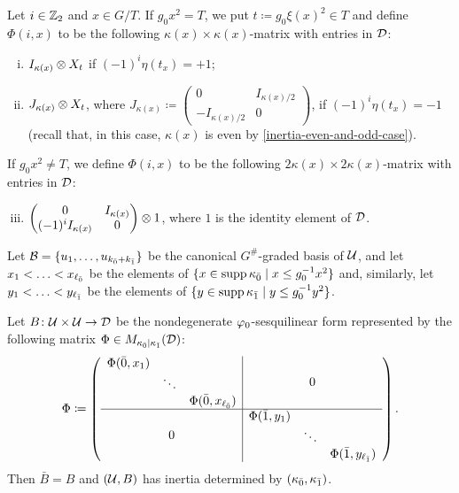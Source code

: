 \begin{defi}\label{defi:blocks-of-Phi}
    Let $i\in \mathbb{Z}_2$ and $x \in G/T$. 
    If $g_0x^2 = T$, we put $t \coloneqq g_0 \xi(x)^2 \in T$ and define $\Phi(i, x)$ to be the following $\kappa(x) \times \kappa(x)$-matrix with entries in $\mathcal{D}$:
    \begin{enumerate}[(i)]
        \item $I_{\kappa(x)} \otimes X_{t}$ if $(-1)^i \eta(t_x) = +1$;
		\item  $J_{\kappa(x)} \otimes X_{t}$, where $J_{\kappa(x)} \coloneqq \begin{pmatrix}
				      0                & I_{\kappa(x)/2} \\
				      -I_{\kappa(x)/2} & 0
			      \end{pmatrix}$, if  $(-1)^i \eta(t_x) = -1$ (recall that, in this case, $\kappa (x)$ is even by \cref{inertia-even-and-odd-case}). 
	\end{enumerate}
    If $g_0 x^2 \neq T$, we define $\Phi(i, x)$ to be the following $2\kappa(x) \times 2\kappa(x)$-matrix with entries in $\mathcal{D}$:
    \begin{enumerate}[(i)]
        \setcounter{enumi}{2}
		\item $\begin{pmatrix}
			0                                                  & I_{\kappa(x)} \\
			(-1)^{i} I_{\kappa(x)} & 0
		\end{pmatrix} \otimes 1$, where $1$ is the identity element of $\mathcal{D}$. 
    \end{enumerate}
\end{defi}

Let $\mathcal B = \{u_1, \ldots, u_{k_{\bar{0}} + k_{\bar{1}}} \}$ be the canonical $G^\#$-graded basis of $\mathcal U$, and 
let $x_1 < \ldots < x_{\ell_{\bar{0}}}$ be the elements of $\{ x \in \operatorname{supp} \kappa_{\bar{0}} \mid x \leq g_0^{-1} x^2 \}$ and, similarly, let $y_1 < \ldots < y_{\ell_{\bar{1}}}$ be the elements of $\{ y \in \operatorname{supp} \kappa_{\bar{1}} \mid y \leq g_0^{-1} y^2 \}$. 

Let $B\colon \mathcal U\times \mathcal U \to \mathcal{D}$ be the nondegenerate $\varphi_0$-sesquilinear form represented by the following matrix $\Phi \in M_{\kappa_{\bar{0}} \mid \kappa_{\bar{1}}} (\mathcal{D})$:
\[\label{eq:puting-the-blocks-of-Phi-together}
    \sbox0{$\begin{matrix}
        \Phi(\bar 0, x_1)&& \\
        & \ddots &\\
        && \Phi(\bar 0, x_{\ell_\bz})
    \end{matrix}$}
    \sbox1{$\begin{matrix}
        \Phi(\bar 1, y_1)&& \\
        & \ddots &\\
        && \Phi(\bar 1, y_{\ell_\bo})
    \end{matrix}$}
    \Phi \coloneqq
    \left(\begin{array}{c|c}
            \usebox{0} & 0\\
            \hline
            0 & \usebox{1}
        \end{array}\right).
\]
%
Then $\bar B = B$ and $(\mathcal U, B)$ has inertia determined by $(\kappa_{\bar{0}}, \kappa_{\bar{1}})$. 

